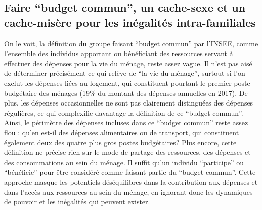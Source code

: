 \documentclass[
  12pt,
]{book}
\begin{document}
\subsection{Faire ``budget commun'', un cache-sexe et un cache-misère
pour les inégalités
intra-familiales}\label{faire-budget-commun-un-cache-sexe-et-un-cache-misuxe8re-pour-les-inuxe9galituxe9s-intra-familiales}

On le voit, la définition du groupe faisant ``budget commun'' par
l'INSEE, comme l'ensemble des individus apportant ou bénéficiant des
ressources servant à effectuer des dépenses pour la vie du ménage, reste
assez vague. Il n'est pas aisé de déterminer précisément ce qui relève
de ``la vie du ménage'', surtout si l'on exclut les dépenses liées au
logement, qui constituent pourtant le premier poste budgétaire des
ménages (19\% du montant des dépenses annuelles en 2017). De plus, les
dépenses occasionnelles ne sont pas clairement distinguées des dépenses
régulières, ce qui complexifie davantage la définition de ce ``budget
commun''. Ainsi, le périmètre des dépenses incluses dans ce ``budget
commun'' reste assez flou : qu'en est-il des dépenses alimentaires ou de
transport, qui constituent également deux des quatre plus gros postes
budgétaires? Plus encore, cette définition ne précise rien sur le mode
de partage des ressources, des dépenses et des consommations au sein du
ménage. Il suffit qu'un individu ``participe'' ou ``bénéficie'' pour
être considéré comme faisant partie du ``budget commun''. Cette approche
masque les potentiels déséquilibres dans la contribution aux dépenses et
dans l'accès aux ressources au sein du ménage, en ignorant donc les
dynamiques de pouvoir et les inégalités qui peuvent exister.
\end{document}
